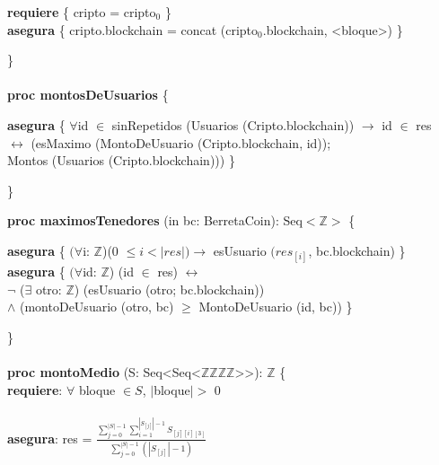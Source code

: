 \documentclass{article}
\newcommand{\Entero}{$\mathds{Z}$}
\begin{document}
        \indent\indent\textbf{requiere} \{ cripto = cripto$_0$ \}\\

        \indent\indent\textbf{asegura} \{ cripto.blockchain = concat (cripto$_0$.blockchain, \textless bloque\textgreater) \}
    
    \}\\\\

    \textbf{proc montosDeUsuarios} \{

        \indent\indent \textbf{asegura} \{ $\forall$id $\in$ sinRepetidos (Usuarios (Cripto.blockchain)) $\rightarrow$ id $\in$ res\\
        \indent\indent\indent\indent\indent $\longleftrightarrow$ (esMaximo (MontoDeUsuario (Cripto.blockchain, id));\\
        \indent\indent\indent\indent\indent Montos (Usuarios (Cripto.blockchain))) \}

    \}
\newpage

    \textbf{proc maximosTenedores} (in bc: BerretaCoin): Seq$<$\Entero$>$ \{

        \indent\indent\textbf{asegura} \{ $(\forall$i: \Entero)(0 $\le i < |res|) \rightarrow$
                                            esUsuario $(res_{[i]}$, bc.blockchain) \}\\

        \indent\indent\textbf{asegura} \{ $(\forall$id: \Entero) (id $\in$ res) $\longleftrightarrow$\\
        \indent\indent\indent\indent\indent $\neg$ ($\exists$ otro: \Entero) (esUsuario (otro; bc.blockchain))\\
        \indent\indent\indent\indent\indent $\land$ (montoDeUsuario (otro, bc) $\ge$ MontoDeUsuario (id, bc)) \}

    \}\\\\

    \textbf{proc montoMedio} 
    (S: Seq\textless Seq\textless$\mathds{Z}$\texttimes$\mathds{Z}$\texttimes$\mathds{Z}$\texttimes$\mathds{Z}$\textgreater\textgreater): $\mathds{Z}$ \{\\
        \indent\indent \textbf{requiere}: $\forall$ bloque $\in S$, $|$bloque$| >$ 0 \\\\
        \indent\indent \textbf{asegura}: res = $\frac{\sum\limits_{j=0}^{|S|-1} \sum\limits_{i=1}^{|S_{[j]}|-1} S_{[j][i][3]}}{\sum\limits_{j=0}^{|S|-1} (|S_{[j]}|-1)}$
\end{document}
